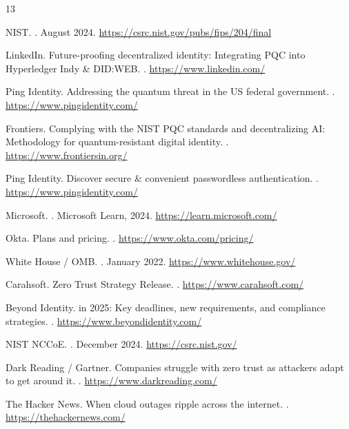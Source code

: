 \documentclass[sigconf,nonacm]{acmart}
\begin{document}
\sloppy

\begin{thebibliography}{13}

NIST.
.
\newblock August 2024.
\newblock \url{https://csrc.nist.gov/pubs/fips/204/final}

LinkedIn.
\newblock Future-proofing decentralized identity: Integrating {PQC} into
  {Hyperledger Indy \& DID:WEB}.
.
\newblock \url{https://www.linkedin.com/}

Ping Identity.
\newblock Addressing the quantum threat in the {US} federal government.
.
\newblock \url{https://www.pingidentity.com/}

Frontiers.
\newblock Complying with the {NIST PQC} standards and decentralizing {AI}:
  Methodology for quantum-resistant digital identity.
.
\newblock \url{https://www.frontiersin.org/}

Ping Identity.
\newblock Discover secure \& convenient passwordless authentication.
.
\newblock \url{https://www.pingidentity.com/}

Microsoft.
.
\newblock Microsoft Learn, 2024.
\newblock \url{https://learn.microsoft.com/}

Okta.
\newblock Plans and pricing.
.
\newblock \url{https://www.okta.com/pricing/}

White House / OMB\@.
.
\newblock January 2022.
\newblock \url{https://www.whitehouse.gov/}

Carahsoft.
 Zero Trust Strategy Release.
.
\newblock \url{https://www.carahsoft.com/}

Beyond Identity.
 in 2025: Key deadlines, new requirements, and
  compliance strategies.
.
\newblock \url{https://www.beyondidentity.com/}

{NIST NCCoE}.
.
\newblock December 2024.
\newblock \url{https://csrc.nist.gov/}

Dark Reading / Gartner.
\newblock Companies struggle with zero trust as attackers adapt to get around
  it.
.
\newblock \url{https://www.darkreading.com/}

The Hacker News.
\newblock When cloud outages ripple across the internet.
.
\newblock \url{https://thehackernews.com/}

\end{thebibliography}
\end{document}
